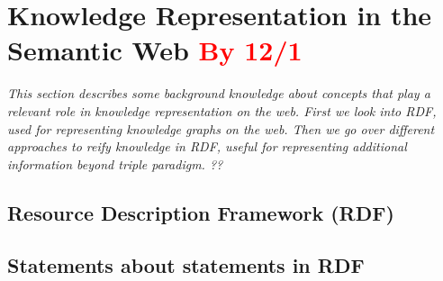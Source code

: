 \section{Knowledge Representation in the Semantic Web \textcolor{red}{By 12/1}}
\label{sec:chp2_semweb}

\textit{This section describes some background knowledge about concepts that play a relevant role in knowledge representation on the web. First we look into RDF, used for representing knowledge graphs on the web. Then we go over different approaches to reify knowledge in RDF, useful for representing additional information beyond triple paradigm. ??}

\subsection{Resource Description Framework (RDF)}


\subsection{Statements about statements in RDF}

